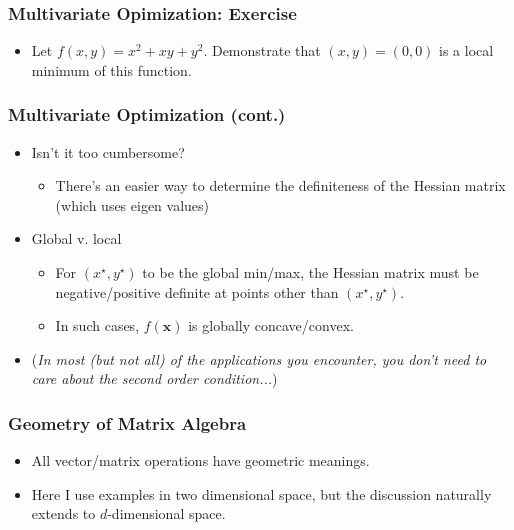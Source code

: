 \documentclass[pdflatex, 12pt]{beamer}
\begin{document}
\begin{frame}
\frametitle{Multivariate Opimization: Exercise}
\begin{itemize}
\item Let $f(x, y) = x^2 + xy + y^2$. Demonstrate that $(x, y) = (0, 0)$ is a local minimum of this function. 
\end{itemize}
\end{frame}

\begin{frame}
\frametitle{Multivariate Optimization (cont.)}
\begin{itemize}
\item Isn't it too cumbersome?
 \begin{itemize}
 \item There's an easier way to determine the definiteness of the Hessian matrix (which uses eigen values)
 \end{itemize}
\vspace{0.4cm}
\item Global v. local
 \begin{itemize}
 \item For $(x^{\star}, y^{\star})$ to be the global min/max, the Hessian matrix must be negative/positive definite at points other than $(x^{\star}, y^{\star})$.
 \item In such cases, $f(\bm{x})$ is globally concave/convex. 
 \end{itemize}
\vspace{0.4cm}
\item (\emph{In most (but not all) of the applications you encounter, you don't need to care about the second order condition...})
\end{itemize}
\end{frame}

\begin{frame}
\frametitle{Geometry of Matrix Algebra}
\begin{itemize}
\item All vector/matrix operations have geometric meanings.
\vspace{0.4cm}
\item Here I use examples in two dimensional space, but the discussion naturally extends to $d$-dimensional space. 
\end{itemize}
\end{frame}
\end{document}
